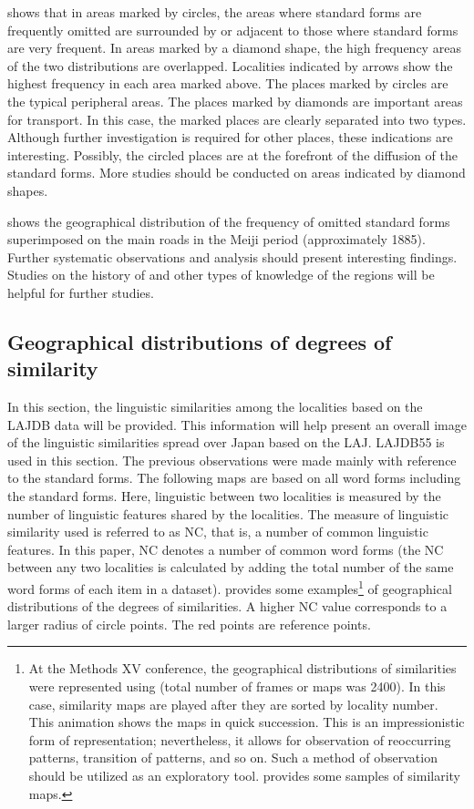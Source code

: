 \documentclass[output=paper]{LSP/langsci}
\begin{document}
 shows that in areas marked by circles, the areas where standard forms are frequently omitted are surrounded by or adjacent to those where standard forms are very frequent. In areas marked by a diamond shape, the high frequency areas of the two distributions are overlapped. Localities indicated by arrows show the highest frequency in each area marked above. The places marked by circles are the typical peripheral areas. The places marked by diamonds are important areas for transport. In this case, the marked places are clearly separated into two types. Although further investigation is required for other places, these indications are interesting. Possibly, the circled places are at the forefront of the diffusion of the standard forms. More studies should be conducted on areas indicated by diamond shapes.

 shows the geographical distribution of the frequency of omitted standard forms superimposed on the main roads in the Meiji period (approximately 1885). Further systematic observations and analysis should present interesting findings. Studies on the history of  and other types of knowledge of the regions will be helpful for further studies.

\subsection{ Geographical distributions of degrees of similarity}
In this section, the linguistic similarities among the localities based on the LAJDB data will be provided. This information will help present an overall image of the linguistic similarities spread over Japan based on the LAJ. LAJDB55 is used in this section. The previous observations were made mainly with reference to the standard forms. The following maps are based on all word forms including the standard forms. Here, linguistic  between two localities is measured by the number of linguistic features shared by the localities. The measure of linguistic similarity used is referred to as NC, that is, a number of common linguistic features. In this paper, NC denotes a number of common word forms (the NC between any two localities is calculated by adding the total number of the same word forms of each item in a dataset).  provides some examples\footnote{At the Methods XV conference, the geographical distributions of similarities were represented using  (total number of frames or maps was 2400). In this case, similarity maps are played after they are sorted by locality number. This animation shows the maps in quick succession. This is an impressionistic form of representation; nevertheless, it allows for observation of reoccurring patterns, transition of patterns, and so on. Such a method of observation should be utilized as an exploratory tool.  provides some samples of similarity maps.} of geographical distributions of the degrees of similarities. A higher NC value corresponds to a larger radius of circle points. The red points are reference points.
\end{document}
